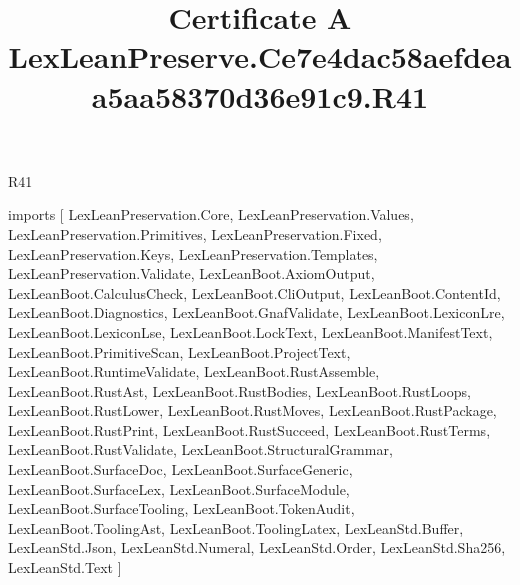 \begin{lexlean}{R41}
\title{Certificate A LexLeanPreserve.Ce7e4dac58aefdeaa5aa58370d36e91c9.R41}
\begin{coremodule}
imports [
  LexLeanPreservation.Core,
  LexLeanPreservation.Values,
  LexLeanPreservation.Primitives,
  LexLeanPreservation.Fixed,
  LexLeanPreservation.Keys,
  LexLeanPreservation.Templates,
  LexLeanPreservation.Validate,
  LexLeanBoot.AxiomOutput,
  LexLeanBoot.CalculusCheck,
  LexLeanBoot.CliOutput,
  LexLeanBoot.ContentId,
  LexLeanBoot.Diagnostics,
  LexLeanBoot.GnafValidate,
  LexLeanBoot.LexiconLre,
  LexLeanBoot.LexiconLse,
  LexLeanBoot.LockText,
  LexLeanBoot.ManifestText,
  LexLeanBoot.PrimitiveScan,
  LexLeanBoot.ProjectText,
  LexLeanBoot.RuntimeValidate,
  LexLeanBoot.RustAssemble,
  LexLeanBoot.RustAst,
  LexLeanBoot.RustBodies,
  LexLeanBoot.RustLoops,
  LexLeanBoot.RustLower,
  LexLeanBoot.RustMoves,
  LexLeanBoot.RustPackage,
  LexLeanBoot.RustPrint,
  LexLeanBoot.RustSucceed,
  LexLeanBoot.RustTerms,
  LexLeanBoot.RustValidate,
  LexLeanBoot.StructuralGrammar,
  LexLeanBoot.SurfaceDoc,
  LexLeanBoot.SurfaceGeneric,
  LexLeanBoot.SurfaceLex,
  LexLeanBoot.SurfaceModule,
  LexLeanBoot.SurfaceTooling,
  LexLeanBoot.TokenAudit,
  LexLeanBoot.ToolingAst,
  LexLeanBoot.ToolingLatex,
  LexLeanStd.Buffer,
  LexLeanStd.Json,
  LexLeanStd.Numeral,
  LexLeanStd.Order,
  LexLeanStd.Sha256,
  LexLeanStd.Text
]


\end{coremodule}
\end{lexlean}
